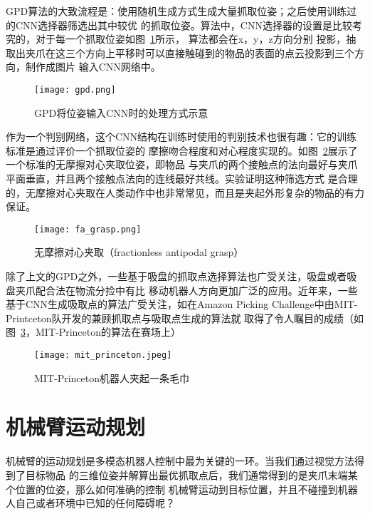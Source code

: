 GPD算法的大致流程是：使用随机生成方式生成大量抓取位姿；之后使用训练过的CNN选择器筛选出其中较优
的抓取位姿。算法中，CNN选择器的设置是比较考究的，对于每一个抓取位姿如图~\ref{fig:gpd}所示，
算法都会在x，y，z方向分别
投影，抽取出夹爪在这三个方向上平移时可以直接触碰到的物品的表面的点云投影到三个方向，制作成图片
输入CNN网络中。

\begin{figure}[ht] %
  \centering
  \texttt{[image: gpd.png]}
  \caption{GPD将位姿输入CNN时的处理方式示意}
  \label{fig:gpd}
\end{figure}

作为一个判别网络，这个CNN结构在训练时使用的判别技术也很有趣：它的训练标准是通过评价一个抓取位姿的
摩擦吻合程度和对心程度实现的。如图~\ref{fig:fa_grasp}展示了一个标准的无摩擦对心夹取位姿，即物品
与夹爪的两个接触点的法向最好与夹爪平面垂直，并且两个接触点法向的连线最好共线。实验证明这种筛选方式
是合理的，无摩擦对心夹取在人类动作中也非常常见，而且是夹起外形复杂的物品的有力保证。


\begin{figure}[ht] %
  \centering
  \texttt{[image: fa\_grasp.png]}
  \caption{无摩擦对心夹取（fractionless antipodal grasp）}
  \label{fig:fa_grasp}
\end{figure}

除了上文的GPD之外，一些基于吸盘的抓取点选择算法也广受关注，吸盘或者吸盘夹爪配合法在物流分捡中有比
移动机器人方向更加广泛的应用。近年来，一些基于CNN生成吸取点的算法广受关注，如在Amazon Picking 
Challenge中由MIT-Printceton队开发的兼顾抓取点与吸取点生成的算法\cite{zeng2018robotic}就
取得了令人瞩目的成绩（如图~\ref{fig:mit_princeton}，MIT-Princeton的算法在赛场上）

\begin{figure}[ht] %
  \centering
  \texttt{[image: mit\_princeton.jpeg]}
  \caption{MIT-Princeton机器人夹起一条毛巾}
  \label{fig:mit_princeton}
\end{figure}

\section{机械臂运动规划}

机械臂的运动规划是多模态机器人控制中最为关键的一环。当我们通过视觉方法得到了目标物品
的三维位姿并解算出最优抓取点后，我们通常得到的是夹爪末端某个位置的位姿，那么如何准确的控制
机械臂运动到目标位置，并且不碰撞到机器人自己或者环境中已知的任何障碍呢？

